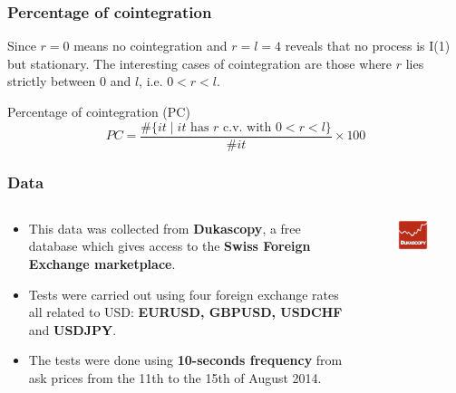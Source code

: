 \documentclass{beamer}
\begin{document}
\begin{frame}
\frametitle{Percentage of cointegration}
Since $r=0$ means no cointegration and $r=l=4$ reveals that no process is I(1) but stationary.
The interesting cases of cointegration are those where $r$ lies strictly
between $0$ and $l$, i.e. $0<r<l$.
\vspace{5mm}
\begin{block}{Percentage of cointegration (PC)}
{\color{blue}
\begin{equation*} \label{eq:pcoint}
PC = 
\frac{\#\{ it \mid \text{$it$ has $r$ c.v. with $0<r<l$}\}}
     {\#it}\times 100
\end{equation*}}
\end{block}
\end{frame}

\begin{frame}
\frametitle{Data}
\begin{columns}
\begin{column}{0.7\textwidth}
\begin{itemize}
\item This data was collected from {\bf Dukascopy}, a free
database which gives access to the {\bf Swiss Foreign Exchange marketplace}.
\item Tests were carried out using four foreign exchange rates all related to
USD: {\bf EURUSD, GBPUSD, USDCHF} and {\bf USDJPY}. 
\item The tests were done using {\bf 10-seconds frequency} from ask prices
from the 11th to the 15th of August 2014. 
\end{itemize}
\end{column}
\begin{column}{0.3\textwidth}
 \begin{figure}[!h]
    \includegraphics[width=\textwidth]{img/dukascopy}

\end{figure}
\end{column}
\end{columns}
\end{frame}
\end{document}
